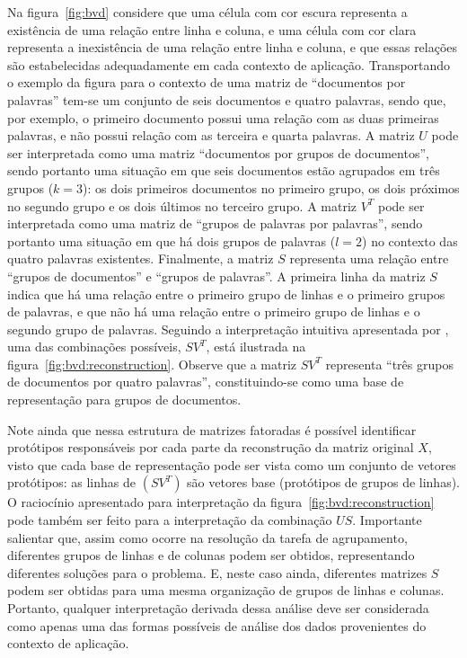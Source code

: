 \documentclass[
    12pt,                %
    oneside,            %
    a4paper,            %
    english,            %
    brazil                %
    ]{abntex2ppgsi}
\begin{document}
Na figura~\ref{fig:bvd} considere que uma célula com cor escura representa a existência de uma relação entre linha e coluna, e uma célula com cor clara representa a inexistência de uma relação entre linha e coluna, e que essas relações são estabelecidas adequadamente em cada contexto de aplicação.
Transportando o exemplo da figura para o contexto de uma matriz de ``documentos por palavras'' tem-se um conjunto de seis documentos e quatro palavras, sendo que, por exemplo, o primeiro documento possui uma relação com as duas primeiras palavras, e não possui relação com as terceira e quarta palavras.
A matriz $U$ pode ser interpretada como uma matriz ``documentos por grupos de documentos'', sendo portanto uma situação em que seis documentos estão agrupados em três grupos ($k = 3$): os dois primeiros documentos no primeiro grupo, os dois próximos no segundo grupo e os dois últimos no terceiro grupo.
A matriz $V^T$ pode ser interpretada como uma matriz de ``grupos de palavras por palavras'', sendo portanto uma situação em que há dois grupos de palavras ($l = 2$) no contexto das quatro palavras existentes.
Finalmente, a matriz $S$ representa uma relação entre ``grupos de documentos'' e ``grupos de palavras''.
A primeira linha da matriz $S$ indica que há uma relação entre o primeiro grupo de linhas e o primeiro grupos de palavras, e que não há uma relação entre o primeiro grupo de linhas e o segundo grupo de palavras.
Seguindo a interpretação intuitiva apresentada por \cite{Long2005}, uma das combinações possíveis, $SV^T$, está ilustrada na figura~\ref{fig:bvd:reconstruction}.
Observe que a matriz $SV^T$ representa ``três grupos de documentos por quatro palavras'', constituindo-se como uma base de representação para grupos de documentos.

Note ainda que nessa estrutura de matrizes fatoradas é possível identificar protótipos responsáveis por cada parte da reconstrução da matriz original $X$, visto que cada base de representação pode ser vista como um conjunto de vetores protótipos: as linhas de $(SV^T)$ são vetores base (protótipos de grupos de linhas).
O raciocínio apresentado para interpretação da figura~\ref{fig:bvd:reconstruction} pode também ser feito para a interpretação da combinação $US$.
Importante salientar que, assim como ocorre na resolução da tarefa de agrupamento, diferentes grupos de linhas e de colunas podem ser obtidos, representando diferentes soluções para o problema.
E, neste caso ainda, diferentes matrizes $S$ podem ser obtidas para uma mesma organização de grupos de linhas e colunas.
Portanto, qualquer interpretação derivada dessa análise deve ser considerada como apenas uma das formas possíveis de análise dos dados provenientes do contexto de aplicação.
\end{document}
